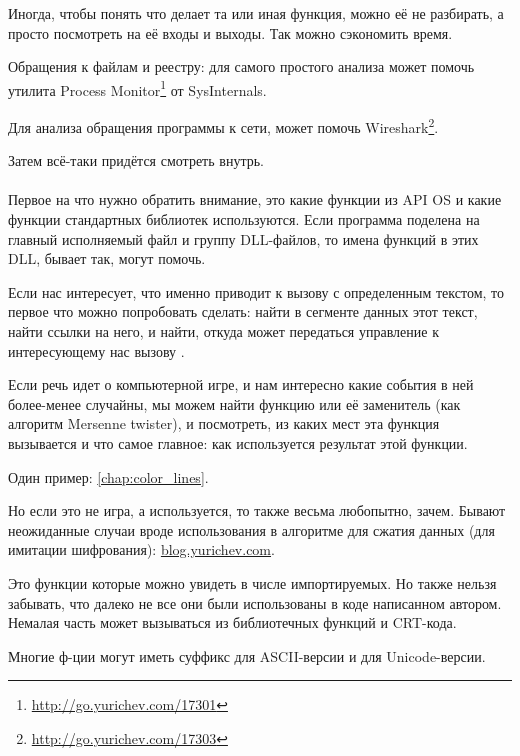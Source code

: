 
Иногда, чтобы понять что делает та или иная функция, можно её не разбирать, а просто посмотреть на её входы и выходы.
Так можно сэкономить время.

Обращения к файлам и реестру: 
для самого простого анализа может помочь утилита Process Monitor\footnote{\url{http://go.yurichev.com/17301}}
от SysInternals.

Для анализа обращения программы к сети, может помочь  Wireshark\footnote{\url{http://go.yurichev.com/17303}}.

Затем всё-таки придётся смотреть внутрь. \\
\\
Первое на что нужно обратить внимание, это какие функции из \ac{API} \ac{OS}
и какие функции стандартных библиотек используются.
Если программа поделена на главный исполняемый файл и группу DLL-файлов, то имена функций в этих DLL, бывает так, могут помочь.

Если нас интересует, что именно приводит к вызову  с определенным текстом, 
то первое что можно попробовать сделать: найти в сегменте данных этот текст, найти ссылки на него, и найти, 
откуда может передаться управление к интересующему нас вызову .

Если речь идет о компьютерной игре, и нам интересно какие события в ней более-менее случайны, 
мы можем найти функцию \rand или её заменитель (как алгоритм Mersenne twister), и посмотреть, 
из каких мест эта функция вызывается и что самое главное: как используется результат этой функции.%

Один пример: \ref{chap:color_lines}. 

Но если это не игра, а \rand используется, то также весьма любопытно, зачем. 
Бывают неожиданные случаи вроде использования \rand в алгоритме для сжатия данных (для имитации шифрования):
\href{http://go.yurichev.com/17221}{blog.yurichev.com}.


Это функции которые можно увидеть в числе импортируемых.
Но также нельзя забывать, что далеко не все они были использованы в коде написанном автором.
Немалая часть может вызываться из библиотечных функций и \ac{CRT}-кода.
	
Многие ф-ции могут иметь суффикс  для ASCII-версии и  для Unicode-версии.

